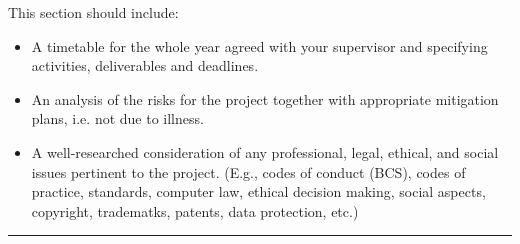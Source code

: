 
This section should include: 
\begin{itemize}
\item A timetable  for  the  whole year  agreed  with  your supervisor  and  specifying activities, deliverables and deadlines. 
\item An analysis of the risks for the project together with appropriate mitigation plans, i.e. not due to illness. 
\item A well-researched  consideration  of  any  professional,  legal,  ethical,  and  social issues  pertinent  to  the  project. 
     (E.g., codes  of  conduct  (BCS),  codes  of  practice, standards,  computer law,  ethical  decision  making,  social aspects, copyright, tradematks, patents, data protection, etc.)
\end{itemize}

\rule{\textwidth}{2pt}

\lipsum
